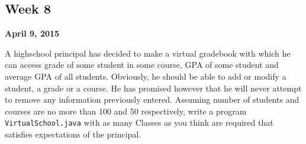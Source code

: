 \documentclass[12pt,letterpaper,twoside]{article}
\begin{document}




\subsection*{Week 8}
\hfill \textbf{April 9, 2015}

A highschool principal has decided to make a virtual gradebook with which he can access grade of some student in some course, GPA of some student and average GPA of all students.
Obviously, he should be able to add or modify a student, a grade or a course.
He has promised however that he will never attempt to remove any information previously entered.
Assuming number of students and courses are no more than 100 and 50 respectively, write a program \texttt{VirtualSchool.java} with as many Classes as you think are required that satisfies expectations of the principal.
\end{document}
